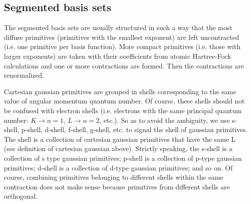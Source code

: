\subsection{Segmented basis sets}
%
%
The segmented basis sets are usually structured in such a way that the
most diffuse primitives (primitives with the smallest exponent) are
left uncontracted (i.e. one primitive per basis function). More
compact primitives (i.e. those with larger exponents) are taken with
their coefficients from atomic Hartree-Fock calculations and one or
more contractions are formed. Then the contractions are renormalized.

Cartesian gaussian primitives are grouped in shells corresponding to
the same value of angular momentum quantum number. Of course, these
shells should not be confused with electron shells (i.e. electrons
with the same principal quantum number: $K \rightarrow n=1$, $L
\rightarrow n=2$, etc.). So as to avoid the ambiguity, we use s-shell,
p-shell, d-shell, f-shell, g-shell, etc. to signal the shell of
gaussian primitives. The shell is a collection of cartesian gaussian
primitives that have the same L (see definition of cartesian gaussian
above). Strictly speaking, the s-shell is a collection of s type
gaussian primitives; p-shell is a collection of p-type gaussian
primitives; d-shell is a collection of d-type gaussian primitives; and
so on. Of course, combining primitives belonging to different shells
within the same contraction does not make sense because primitives
from different shells are orthogonal.

